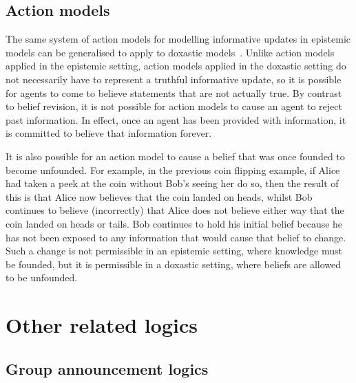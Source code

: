 \subsection{Action models}

The same system of action models for modelling informative updates in epistemic
models can be generalised to apply to doxastic
models~\cite{vanditmarsch2007dynamic}. Unlike action models applied in the
epistemic setting, action models applied in the doxastic setting do not
necessarily have to represent a truthful informative update, so it is possible
for agents to come to believe statements that are not actually true. By contrast
to belief revision, it is not possible for action models to cause an agent to
reject past information. In effect, once an agent has been provided with
information, it is committed to believe that information forever. 

It is also possible for an action model to cause a belief that was once founded
to become unfounded. For example, in the previous coin flipping example, if
Alice had taken a peek at the coin without Bob's seeing her do so, then the
result of this is that Alice now believes that the coin landed on heads, whilst
Bob continues to believe (incorrectly) that Alice does not believe either way
that the coin landed on heads or tails. Bob continues to hold his initial belief
because he has not been exposed to any information that would cause that belief
to change. Such a change is not permissible in an epistemic setting, where
knowledge must be founded, but it is permissible in a doxastic setting, where
beliefs are allowed to be unfounded.

\section{Other related logics}

\subsection{Group announcement logics}

